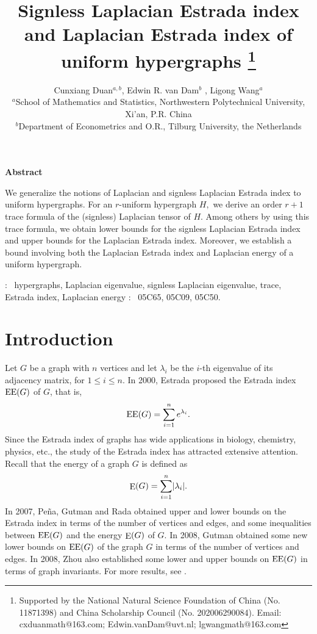 \documentclass[11pt]{article}
\def\EE{\mathop{\rm EE }\nolimits}
\def\E{\mathop{\rm E }\nolimits}
\begin{document}
\textwidth 150mm \textheight 225mm
\title{Signless Laplacian Estrada index and Laplacian Estrada index of uniform hypergraphs
\thanks{Supported by the National Natural Science Foundation of China (No. 11871398) and China Scholarship Council (No. 202006290084). Email: cxduanmath@163.com; Edwin.vanDam@uvt.nl; lgwangmath@163.com}}
\author{{Cunxiang Duan$^{a,b}$, Edwin R. van Dam$^{b}$
,
Ligong Wang$^{a}$ }\\
{\small $^{a}$School of Mathematics and Statistics, Northwestern
Polytechnical University, Xi'an, P.R. China}\\
{\small $^{b}$Department of Econometrics and O.R., Tilburg University, the Netherlands}} 
\maketitle
\begin{center}
\begin{minipage}{120mm}
\vskip 0.3cm
\begin{center}
{\small {\bf Abstract}}
\end{center}
{\small
We generalize the notions of Laplacian and signless Laplacian Estrada index to uniform hypergraphs. For an $r$-uniform hypergraph $H,$ we derive an order $r+1$ trace formula of the (signless) Laplacian tensor of $H.$ Among others by using this trace formula, we obtain lower bounds for the signless Laplacian Estrada index and upper bounds for the Laplacian Estrada index. Moreover, we establish a bound involving both the Laplacian Estrada index and Laplacian energy of a uniform hypergraph.

\vskip 0.1in : \  hypergraphs, Laplacian eigenvalue, signless Laplacian eigenvalue, trace, Estrada index, Laplacian energy  \vskip
0.1in : \  05C65, 05C09, 05C50.}
\end{minipage}
\end{center}

\section{Introduction }
\label{sec:ch6-introduction}

Let $G$ be a graph with $n$ vertices and let $\lambda_{i}$ be the $i$-th eigenvalue of its adjacency matrix, for $1 \leq i \leq n.$ In 2000, Estrada \cite{E} proposed the Estrada index $\EE(G)$ of $G$, that is,
$$\EE(G)=\sum\limits_{i=1}^{n}e^{\lambda_{i}}.$$
Since the Estrada index of graphs has wide applications in biology, chemistry, physics, etc., the study of the Estrada index has attracted extensive attention.
Recall that the energy of a graph $G$ is defined as
$$\E(G)=\sum\limits_{i=1}^{n}\lvert \lambda_{i}\rvert.$$ In 2007, Pe\~{n}a, Gutman and Rada \cite{PJR} obtained upper and lower bounds on the Estrada index in terms of the number of vertices and edges, and some inequalities between $\EE(G)$ and the energy $\E(G)$ of $G.$ In 2008, Gutman \cite{G} obtained some new lower bounds on $\EE(G)$ of the graph $G$ in terms of the number of vertices and edges. In 2008, Zhou \cite{Z} also established some lower and upper bounds on $\EE(G)$ in terms of graph invariants. For more results, see \cite{CFD,D,ZZL}.
\end{document}
